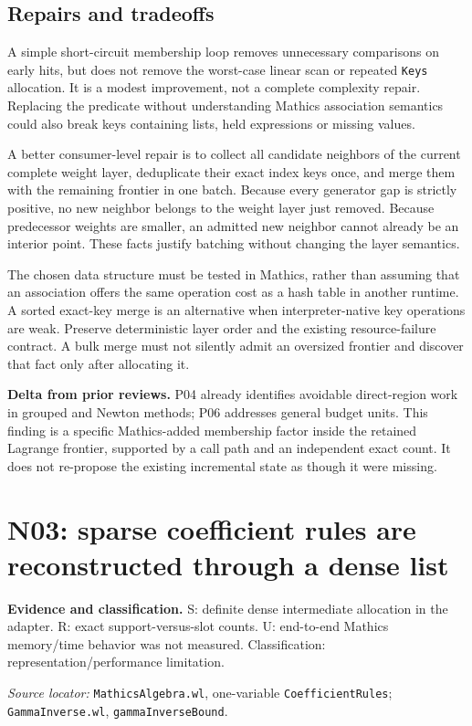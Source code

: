 \documentclass[11pt,letterpaper]{article}
\newcommand{\code}[1]{\nolinkurl{#1}}
\newcommand{\source}[1]{\par\textit{Source locator:} #1\par}
\newcommand{\status}[1]{\par\textbf{Evidence and classification.} #1\par}
\newcommand{\novelty}[1]{\par\textbf{Delta from prior reviews.} #1\par}
\begin{document}
\subsection{Repairs and tradeoffs}
A simple short-circuit membership loop removes unnecessary comparisons on
early hits, but does not remove the worst-case linear scan or repeated
\code{Keys} allocation. It is a modest improvement, not a complete complexity
repair. Replacing the predicate without understanding Mathics association
semantics could also break keys containing lists, held expressions or
missing values.

A better consumer-level repair is to collect all candidate neighbors of the
current complete weight layer, deduplicate their exact index keys once, and
merge them with the remaining frontier in one batch. Because every generator
gap is strictly positive, no new neighbor belongs to the weight layer just
removed. Because predecessor weights are smaller, an admitted new neighbor
cannot already be an interior point. These facts justify batching without
changing the layer semantics.

The chosen data structure must be tested in Mathics, rather than assuming
that an association offers the same operation cost as a hash table in another
runtime. A sorted exact-key merge is an alternative when interpreter-native
key operations are weak. Preserve deterministic layer order and the existing
resource-failure contract. A bulk merge must not silently admit an
oversized frontier and discover that fact only after allocating it.

\novelty{P04 already identifies avoidable direct-region work in grouped and
Newton methods; P06 addresses general budget units. This finding is a
specific Mathics-added membership factor inside the retained Lagrange
frontier, supported by a call path and an independent exact count. It does
not re-propose the existing incremental state as though it were missing.}

\section{N03: sparse coefficient rules are reconstructed through a dense list}
\label{sec:sparse}
\status{S: definite dense intermediate allocation in the adapter. R: exact
support-versus-slot counts. U: end-to-end Mathics memory/time behavior was
not measured. Classification: representation/performance limitation.}
\source{\code{MathicsAlgebra.wl}, one-variable \code{CoefficientRules};
\code{GammaInverse.wl}, \code{gammaInverseBound}.
\cite{repo-malgebra,repo-gamma}}
\end{document}
